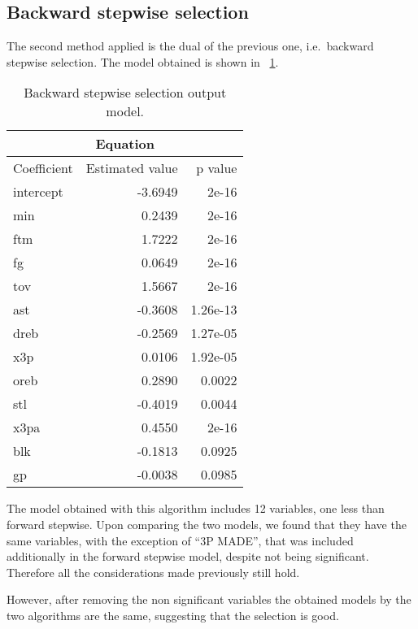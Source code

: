 \subsection{Backward stepwise selection}

The second method applied is the dual of the previous one, i.e.\ backward stepwise selection. The model obtained is shown in \Fig~\ref{table:BackwardModelSummary}.

\begin{table}[H]
	\centering
	\begin{tabular}{|| l | r | r ||} 
		\hline
		\multicolumn{3}{|c|}{Equation} \\
		\hline
		Coefficient & Estimated value & p value \\
		\hline
		intercept & -3.6949 & 2e-16 \\
		min & 0.2439 & 2e-16 \\
		ftm & 1.7222 & 2e-16 \\
		fg & 0.0649 & 2e-16 \\
		tov & 1.5667 & 2e-16 \\
		ast & -0.3608 & 1.26e-13 \\
		dreb & -0.2569 & 1.27e-05 \\
		x3p & 0.0106 & 1.92e-05 \\
		oreb & 0.2890 & 0.0022 \\
		stl & -0.4019 & 0.0044 \\
		x3pa & 0.4550 & 2e-16 \\
		blk & -0.1813 & 0.0925 \\
		gp & -0.0038 & 0.0985 \\
		\hline
	\end{tabular}
	\caption{Backward stepwise selection output model.}
	\label{table:BackwardModelSummary}
\end{table}

The model obtained with this algorithm includes 12 variables, one less than forward stepwise. Upon comparing the two models, we found that they have the same variables, with the exception of ``3P MADE'', that was included additionally in the forward stepwise model, despite not being significant.
Therefore all the considerations made previously still hold.

However, after removing the non significant variables the obtained models by the two algorithms are the same, suggesting that the selection is good.